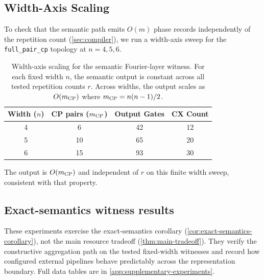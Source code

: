 \subsection{Width-Axis Scaling}

To check that the semantic path emits $O(m)$ phase records independently
of the repetition count (\cref{sec:compiler}), we run a width-axis sweep for the
\texttt{full\_pair\_cp} topology at $n = 4, 5, 6$.

\begin{table}[htbp]
\centering
\small
\begin{tabular}{cccc}
\toprule
Width ($n$) & CP pairs ($m_{\rm CP}$) & Output Gates & CX Count \\
\midrule
4 & 6  & 42 & 12 \\
5 & 10 & 65 & 20 \\
6 & 15 & 93 & 30 \\
\bottomrule
\end{tabular}
\caption{Width-axis scaling for the semantic Fourier-layer witness. For
each fixed width $n$, the semantic output is constant across all tested
repetition counts $r$. Across widths, the output scales as $O(m_{\rm CP})$
where $m_{\rm CP} = n(n-1)/2$.}
\label{tab:width-axis-scaling}
\end{table}

The output is $O(m_{\rm CP})$ and independent of $r$ on this finite
width sweep, consistent with that property.

\subsection{Exact-semantics witness results}
These experiments exercise the exact-semantics corollary
(\cref{cor:exact-semantics-corollary}), not the main resource tradeoff
(\cref{thm:main-tradeoff}). They verify the constructive
aggregation path on the tested fixed-width witnesses and record how configured
external pipelines behave predictably across the representation
boundary. Full data tables are in \cref{app:supplementary-experiments}.

